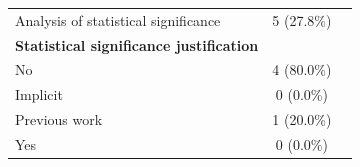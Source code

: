 \documentclass[a4paper]{article}
\begin{document}
\begin{appendices}
\begin{table}[ht]
\begin{tabularx}{\textwidth}{|l|c|X|}
		Analysis of statistical significance & 5 (27.8\%) & \cite{10.1145/3597503.3623345,10648982,10659742,10746847,10704582}\\
		\textbf{Statistical significance justification}&& \\
		\hspace{3mm} No & 4 (80.0\%) & \cite{10648982,10659742,10746847,10704582} \\
		\hspace{3mm} Implicit & 0 (0.0\%) &  \\
		\hspace{3mm} Previous work & 1 (20.0\%) & \cite{10.1145/3597503.3623345}\\
		\hspace{3mm} Yes & 0 (0.0\%) &   \\
		\hline
	\end{tabularx}
	\label{refs:mapping_metrics}
\end{table}


\end{appendices}
\end{document}
